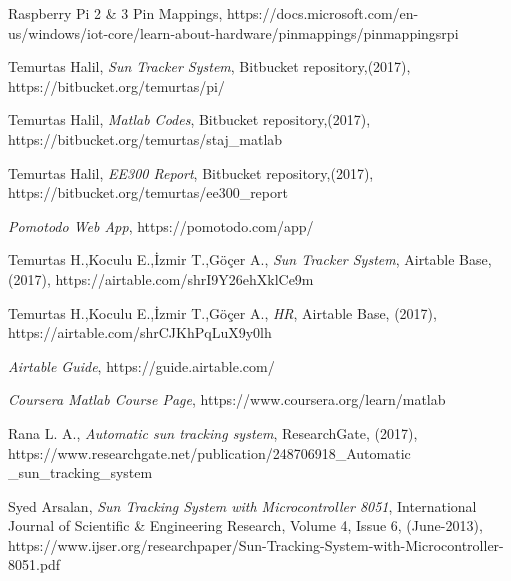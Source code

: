 \begingroup
\renewcommand{\section}[2]{}%
\begin{thebibliography}{}

 Raspberry Pi 2 \& 3 Pin Mappings,
	https://docs.microsoft.com/en-us/windows/iot-core/learn-about-hardware/pinmappings/pinmappingsrpi

 Temurtas Halil,
	\textit{Sun Tracker System},
	Bitbucket repository,(2017),
	https://bitbucket.org/temurtas/pi/

 Temurtas Halil,
	\textit{Matlab Codes},
	Bitbucket repository,(2017),
	https://bitbucket.org/temurtas/staj\_matlab

 Temurtas Halil,
	\textit{EE300 Report},
	Bitbucket repository,(2017),
	https://bitbucket.org/temurtas/ee300\_report

	\textit{Pomotodo Web App},
	https://pomotodo.com/app/

 Temurtas H.,Koculu E.,İzmir T.,Göçer A.,
	\textit{Sun Tracker System},
	Airtable Base, (2017),
	https://airtable.com/shrI9Y26ehXklCe9m

 Temurtas H.,Koculu E.,İzmir T.,Göçer A.,
	\textit{HR},
	Airtable Base, (2017), https://airtable.com/shrCJKhPqLuX9y0lh

	\textit{Airtable Guide},
	https://guide.airtable.com/

	\textit{Coursera Matlab Course Page},
	https://www.coursera.org/learn/matlab

 Rana L. A., \textit{Automatic sun tracking system},
	ResearchGate, 
	(2017), 
	https://www.researchgate.net/publication/248706918\_Automatic\\\_sun\_tracking\_system 

 Syed Arsalan, \textit{Sun Tracking System with Microcontroller 8051},
	International Journal of Scientific \& Engineering Research, Volume 4, Issue 6, (June-2013),
	https://www.ijser.org/researchpaper/Sun-Tracking-System-with-Microcontroller-8051.pdf


\end{thebibliography}
\endgroup

